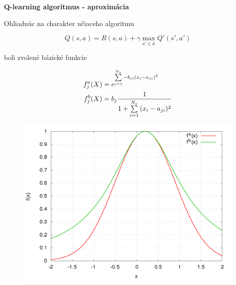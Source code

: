 \documentclass[xcolor=dvipsnames]{beamer}
\begin{document}
\begin{frame}{\bf Q-learning algoritmus - aproximácia}

Ohliadnúc na charakter učiaceho algoritmu

\begin{equation} \label{eu_eqn}
Q(s,a) = R(s,a) + \gamma \max_{a' \in \mathbb{A}} Q'(s', a') \nonumber
\end{equation}



\begin{minipage}{.5\textwidth}
  boli zvolené bázické funkcie

  \begin{align}
    f_j^a(\boldmath{X}) &= e^{ \sum\limits_{i=1}^{N_s}{-b_{ji}(x_i - a_{ji})^2} } \nonumber \\
    f_j^b(\boldmath{X}) &= b_{j}\frac{1}{1 + \sum\limits_{i=1}^{N_s}{(x_i - a_{ji})^2}} \nonumber
  \end{align}


\end{minipage}%
\begin{minipage}{.5\textwidth}

  \begin{figure}[!htb]
  \centering
  \includegraphics[scale=.2]{../pictures/gaussian_1D.png}
  \end{figure}

\end{minipage}





\end{frame}
\end{document}
